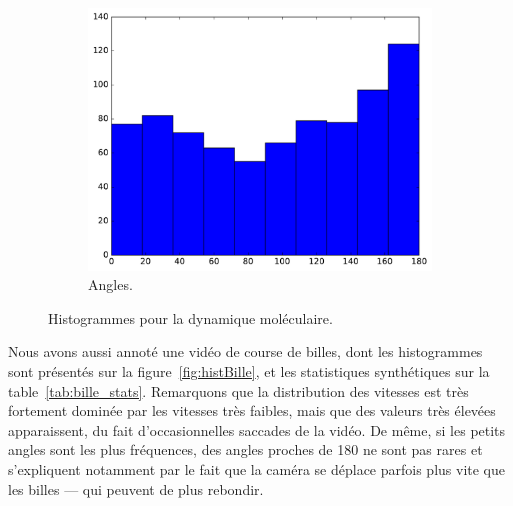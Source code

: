 \begin{figure}[htb]
\begin{subfigure}[t]{\subImgWclicks}
			\centering
			\includegraphics[width=\textwidth]{figures/ch3/atom_angle}
			\caption{Angles.}
			\label{fig:atom_angle}
		\end{subfigure}
		\caption[Histogrammes pour la dynamique moléculaire]{Histogrammes pour la dynamique moléculaire.}
		\label{fig:histAtoms}
	\end{figure}
	
	Nous avons aussi annoté une vidéo de course de billes, dont les histogrammes sont présentés sur la figure~\ref{fig:histBille}, et les statistiques synthétiques sur la table~\ref{tab:bille_stats}. Remarquons que la distribution des vitesses est très fortement dominée par les vitesses très faibles, mais que des valeurs très élevées apparaissent, du fait d'occasionnelles saccades de la vidéo. De même, si les petits angles sont les plus fréquences, des angles proches de 180\textdegree{} ne sont pas rares et s'expliquent notamment par le fait que la caméra se déplace parfois plus vite que les billes --- qui peuvent de plus rebondir.
	
